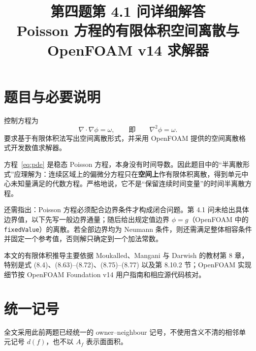 \documentclass[UTF8,a4paper,11pt]{ctexart}
\title{第四题第 4.1 问详细解答\\[0.4em]
\large Poisson 方程的有限体积空间离散与 OpenFOAM v14 求解器}
\author{}
\date{}
\begin{document}
\maketitle

\section{题目与必要说明}

控制方程为
\begin{equation}
  \nabla\!\cdot\!\nabla\phi=\omega,
  \qquad\text{即}\qquad
  \nabla^2\phi=\omega .
  \label{eq:pde}
\end{equation}
要求基于有限体积法写出空间离散形式，并采用 OpenFOAM 提供的空间离散格式开发数值求解器。

方程~\eqref{eq:pde} 是稳态 Poisson 方程，本身没有时间导数。因此题目中的“半离散形式”应理解为：连续区域上的偏微分方程只在\textbf{空间上}作有限体积离散，得到单元中心未知量满足的代数方程。严格地说，它不是“保留连续时间变量”的时间半离散方程。

还需指出：Poisson 方程必须配合边界条件才构成闭合问题。第 4.1 问未给出具体边界值，以下先写一般边界通量；随后给出规定值边界
\(\phi=g\)（OpenFOAM 中的 \texttt{fixedValue}）的离散。若全部边界均为 Neumann 条件，则还需满足整体相容条件并固定一个参考值，否则解只确定到一个加法常数。

本文的有限体积推导主要依据 Moukalled、Mangani 与 Darwish 的教材第 8 章，特别是式 (8.4)、(8.63)--(8.72)、(8.75)--(8.77) 以及第 8.10.2 节\cite{Moukalled2016}；OpenFOAM 实现细节按 OpenFOAM Foundation v14 用户指南和相应源代码\cite{OFGuide,OFfvmlap,OFcorrected,OFsurface,OFfixedValue}核对。

\section{统一记号}

全文采用此前两题已经统一的 owner--neighbour 记号，不使用含义不清的相邻单元记号 \(d(f)\)，也不以 \(A_f\) 表示面面积。
\end{document}

